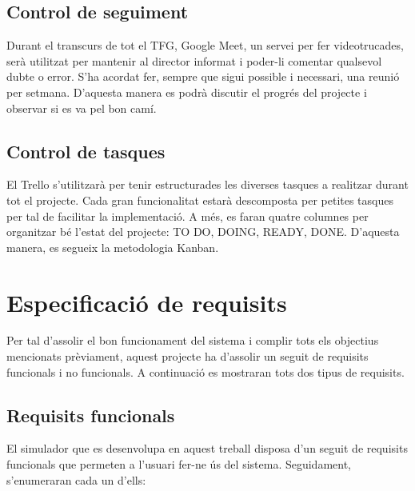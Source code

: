 \documentclass[a4paper]{article}
\begin{document}
\subsection{Control de seguiment}
    
Durant el transcurs de tot el TFG, Google Meet, un servei per fer videotrucades, serà utilitzat per mantenir al director informat i poder-li comentar qualsevol dubte o error. S'ha acordat fer, sempre que sigui possible i necessari, una reunió per setmana. D'aquesta manera es podrà discutir el progrés del projecte i observar si es va pel bon camí.

\subsection{Control de tasques}

El Trello s'utilitzarà per tenir estructurades les diverses tasques a realitzar durant tot el projecte. Cada gran funcionalitat estarà descomposta per petites tasques per tal de facilitar la implementació. A més, es faran quatre columnes per organitzar bé l'estat del projecte: TO DO, DOING, READY, DONE. D'aquesta manera, es segueix la metodologia Kanban.

\newpage
\section{Especificació de requisits}
Per tal d'assolir el bon funcionament del sistema i complir tots els objectius mencionats prèviament, aquest projecte ha d'assolir un seguit de requisits funcionals i no funcionals. A continuació es mostraran tots dos tipus de requisits.

\subsection{Requisits funcionals}
El simulador que es desenvolupa en aquest treball disposa d'un seguit de requisits funcionals que permeten a l'usuari fer-ne ús del sistema. Seguidament, s'enumeraran cada un d'ells:
\end{document}
